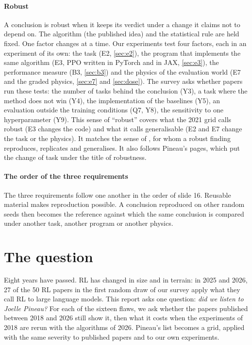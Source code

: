 \paragraph{Robust}
A conclusion is robust when it keeps its verdict under a change it claims not to depend on. The
algorithm (the published idea) and the statistical rule are held fixed. One factor changes at a time.
Our experiments test four factors, each in an experiment of its own: the task (E2, \cref{sec:e2}), the program that implements the same
algorithm (E3, PPO written in PyTorch and in JAX, \cref{sec:e3}), the performance measure (B3,
\cref{sec:b3}) and the physics of the evaluation world (E7 and the graded physics, \cref{sec:e7} and
\cref{sec:dose}). The survey asks whether papers run these tests: the number of tasks behind the
conclusion (Y3), a task where the method does not win (Y4), the implementation of the baselines (Y5),
an evaluation outside the training conditions (Q7, Y8), the sensitivity to one hyperparameter (Y9).
This sense of \enquote{robust} covers what the 2021 grid calls robust (E3 changes the code) and what it
calls generalisable (E2 and E7 change the task or the physics). It matches the sense of
\textcite{bollen2015robust}, for whom a robust finding reproduces, replicates and generalises. It also
follows Pineau's pages, which put the change of task under the title of robustness.

\paragraph{The order of the three requirements}
The three requirements follow one another in the order of slide 16. Reusable material makes
reproduction possible. A conclusion reproduced on other random seeds then becomes the reference against
which the same conclusion is compared under another task, another program or another physics.

\section{The question}\label{sec:intro-question}

Eight years have passed. RL has changed in size and in terrain: in 2025 and 2026, 27 of the 50 RL papers
in the first random draw of our survey apply what they call RL to large language models. This
report asks one question: \emph{did we listen to Joelle Pineau?} For each of the sixteen flaws, we ask
whether the papers published between 2018 and 2026 still show it, then what it costs when the
experiments of 2018 are rerun with the algorithms of 2026. Pineau's list becomes a grid, applied with
the same severity to published papers and to our own experiments.

